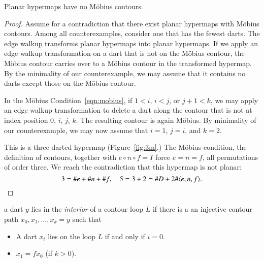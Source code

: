 \begin{lemma}\label{lemma:no-mobius}  
Planar hypermaps have no M\"obius contours.
\end{lemma}

\begin{proof} Assume for a contradiction that there exist planar
hypermaps with M\"obius contours.  Among all counterexamples,
consider one that has the fewest darts.  The edge walkup transforms
planar hypermaps into planar hypermaps.  If we apply an edge walkup
transformation on a dart that is not on the M\"obius contour, the
M\"obius contour carries over to a M\"obius contour 
in the transformed hypermap.  By the
minimality of our counterexample, we may assume that it contains no
darts except those on the M\"obius contour.

In the M\"obius Condition~\ref{eqn:mobius}, if $1<i$, $i<j$, or
$j+1<k$, we may apply an edge walkup transformation to  delete a
dart along the contour that is not at index position $0$, $i$,
$j$, $k$.  The resulting contour is again M\"obius.
By minimality of our counterexample, we may now assume
that $i=1$, $j=i$, and $k=2$.

This is a three darted hypermap (Figure~\ref{fig:3m}.)  
The M\"obius condition, the
definition of contours, together with $e\circ n\circ f=I$ force
$e=n=f$, all permutations of order three. We reach the contradiction
that this hypermap is not planar:
    $$3 = \# e + \# n + \# f,\quad 5 = 3+2 = \# D + 2 \#\langle e,n,f\rangle.$$
\end{proof}

\begin{definition}\label{def:interior} 
a dart $y$ lies in the {\it interior} of a contour
loop $L$ if there is a an injective contour path
$x_0,x_1,\ldots,x_k=y$ such that 
\begin{itemize}
 \item A dart $x_i$ lies on the loop $L$ if and only if $i=0$.
 \item $x_1 = f x_0$ (if $k>0$).
\end{itemize}
\end{definition}


